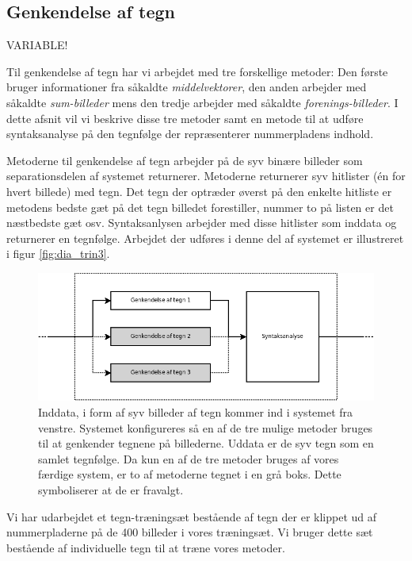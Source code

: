 \subsection{Genkendelse af tegn}
\label{sec_monster}

VARIABLE!

Til genkendelse af tegn har vi arbejdet med tre forskellige metoder: Den første bruger informationer fra såkaldte \textit{middelvektorer}, den anden arbejder med såkaldte \textit{sum-billeder} mens den tredje arbejder med såkaldte \textit{forenings-billeder}. I dette afsnit vil vi beskrive disse tre metoder samt en metode til at udføre syntaksanalyse på den tegnfølge der repræsenterer nummerpladens indhold.

Metoderne til genkendelse af tegn arbejder på de syv binære billeder som separationsdelen af systemet returnerer. Metoderne returnerer syv hitlister (én for hvert billede) med tegn. Det tegn der optræder øverst på den enkelte hitliste er metodens bedste gæt på det tegn billedet forestiller, nummer to på listen er det næstbedste gæt osv. Syntaksanlysen arbejder med disse hitlister som inddata og returnerer en tegnfølge. Arbejdet der udføres i denne del af systemet er illustreret i figur \vref{fig:dia_trin3}.

\begin{figure}[htp]
\centering
\includegraphics[width=12cm]{system/illu/dia_trin3.png} 
\caption{Inddata, i form af syv billeder af tegn kommer ind i systemet fra venstre. Systemet konfigureres så en af de tre mulige metoder bruges til at genkender tegnene på billederne. Uddata er de syv tegn som en samlet tegnfølge. Da kun en af de tre metoder bruges af vores færdige system, er to af metoderne tegnet i en grå boks. Dette symboliserer at de er fravalgt.}
\label{fig:dia_trin3}
\end{figure}

Vi har udarbejdet et tegn-træningsæt bestående af tegn der er klippet ud af nummerpladerne på de 400 billeder i vores træningsæt. Vi bruger dette sæt bestående af individuelle tegn til at træne vores metoder.


